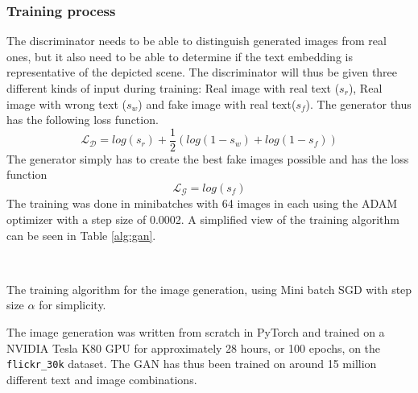 \documentclass[../main.tex]{subfiles}
\begin{document}
\subsubsection{Training process}
The discriminator needs to be able to distinguish generated images from real ones, but it also need to be able to determine if the text embedding is representative of the depicted scene. The discriminator will thus be given three different kinds of input during training: Real image with real text ($s_r$), Real image with wrong text ($s_w$) and fake image with real text($s_f$). The generator thus has the following loss function. 
\begin{equation}
    \mathcal{L_D} = log(s_r) + \frac{1}{2} \left( log(1 - s_w) + log(1-s_f)\right) 
\end{equation}
The generator simply has to create the best fake images possible and has the loss function 
\begin{equation}
    \mathcal{L_G} = log(s_f)
\end{equation}
The training was done in minibatches with 64 images in each using the ADAM optimizer with a step size of 0.0002. A simplified view of the training algorithm can be seen in Table \ref{alg:gan}.
\begin{algorithm}[h]
\SetAlgoLined
{}\\
\caption{The training algorithm for the image generation, using Mini batch SGD with step size $\alpha$ for simplicity.}\label{alg:gan}
\end{algorithm}
The image generation was written from scratch in PyTorch and trained on a NVIDIA Tesla K80 GPU for approximately 28 hours, or 100 epochs, on the \texttt{flickr\_30k} dataset. The GAN has thus been trained on around 15 million different text and image combinations. 
\end{document}
